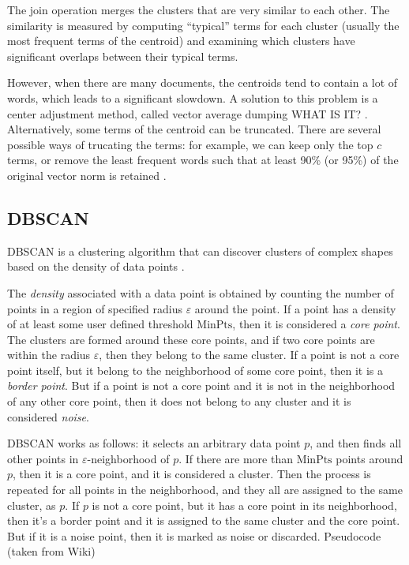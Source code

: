 The join operation merges the clusters that are very similar 
to each other. The similarity is measured by computing ``typical''
terms for each cluster (usually the most frequent terms of 
the centroid) and examining which clusters have significant
overlaps between their typical terms. 


However, when there are many documents, the centroids tend 
to contain a lot of words, which leads to a significant slowdown. 
A solution to this problem is a center adjustment method, called
vector average dumping WHAT IS IT? \cite{larsen1999fast}. 
Alternatively, some terms of the centroid can be 
truncated. There are several possible ways of trucating
the terms: for example, we can keep only the top $c$ terms, or
remove the least frequent words such that at least 90\% (or 95\%) of 
the original vector norm is retained \cite{schutze1997projections}.



\subsection{DBSCAN} \label{sec:dbscan}


DBSCAN is a clustering algorithm that can discover 
clusters of complex shapes based on the density of 
data points \cite{ester1996density}. 

The \emph{density} associated with a data point is obtained by 
counting the number of points in a region of specified radius $\varepsilon$
around the point. If a point has a density of at least some user defined 
threshold $\text{MinPts}$, then it is considered a \emph{core point}. 
The clusters are formed around these core points, and if two core points 
are within the radius $\varepsilon$, then they belong to the same cluster. 
If a point is not a core point itself, but it belong to the neighborhood of some 
core point, then it is a \emph{border point}. But if a point is not a core point 
and it is not in the neighborhood of any other core point, then it does not 
belong to any cluster and it is considered \emph{noise}. 

DBSCAN works as follows: it selects an arbitrary data point $p$, and then 
finds all other points in $\varepsilon$-neighborhood of $p$. If 
there are more than $\text{MinPts}$ points around $p$, then it is a core point, 
and it is considered a cluster. Then the process is repeated for all points in 
the neighborhood, and they all are assigned to the same cluster, as $p$. 
If $p$ is not a core point, but it has a core point in its neighborhood, then 
it's a border point and it is assigned to the same cluster and the core point.
But if it is a noise point, then it is marked as noise or discarded. 
Pseudocode (taken from Wiki)




